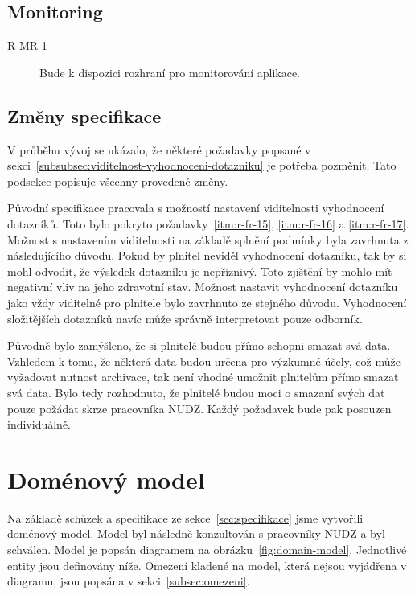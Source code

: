 \subsection{Monitoring}\label{subsec:monitoring}

\begin{description}
    \item[R-MR-1]
    Bude k dispozici rozhraní pro monitorování aplikace.
\end{description}

\subsection{Změny specifikace}\label{subsec:zmeny-specifikace}

V průběhu vývoj se ukázalo, že některé požadavky popsané v sekci~\ref{subsubsec:viditelnost-vyhodnoceni-dotazniku} je potřeba pozměnit.
Tato podsekce popisuje všechny provedené změny.

Původní specifikace pracovala s možností nastavení viditelnosti vyhodnocení dotazníků.
Toto bylo pokryto požadavky~\ref{itm:r-fr-15}, \ref{itm:r-fr-16} a \ref{itm:r-fr-17}.
Možnost s nastavením viditelnosti na základě splnění podmínky byla zavrhnuta z následujícího důvodu.
Pokud by plnitel neviděl vyhodnocení dotazníku, tak by si mohl odvodit, že výsledek dotazníku je nepříznivý.
Toto zjištění by mohlo mít negativní vliv na jeho zdravotní stav.
Možnost nastavit vyhodnocení dotazníku jako vždy viditelné pro plnitele bylo zavrhnuto ze stejného důvodu.
Vyhodnocení složitějších dotazníků navíc může správně interpretovat pouze odborník.

Původně bylo zamýšleno, že si plnitelé budou přímo schopni smazat svá data.
Vzhledem k tomu, že některá data budou určena pro výzkumné účely, což může vyžadovat nutnost archivace, tak není vhodné umožnit plnitelům přímo smazat svá data.
Bylo tedy rozhodnuto, že plnitelé budou moci o smazaní svých dat pouze požádat skrze pracovníka NUDZ\@.
Každý požadavek bude pak posouzen individuálně.


\section{Doménový model}\label{sec:domenovy-model}

Na základě schůzek a specifikace ze sekce~\ref{sec:specifikace} jsme vytvořili doménový model.
Model byl následně konzultován s pracovníky NUDZ a byl schválen.
Model je popsán diagramem na obrázku~\ref{fig:domain-model}.
Jednotlivé entity jsou definovány níže.
Omezení kladené na model, která nejsou vyjádřena v diagramu, jsou popsána v sekci~\ref{subsec:omezeni}.

